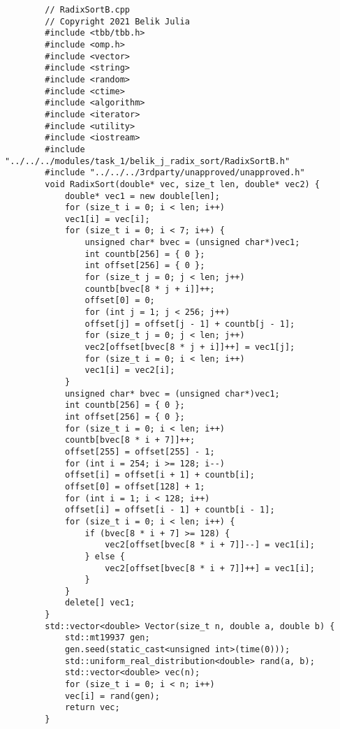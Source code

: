 \documentclass{report}
\begin{document}
	\begin{lstlisting}
		// RadixSortB.cpp
		// Copyright 2021 Belik Julia
		#include <tbb/tbb.h>
		#include <omp.h>
		#include <vector>
		#include <string>
		#include <random>
		#include <ctime>
		#include <algorithm>
		#include <iterator>
		#include <utility>
		#include <iostream>
		#include "../../../modules/task_1/belik_j_radix_sort/RadixSortB.h"
		#include "../../../3rdparty/unapproved/unapproved.h"
		void RadixSort(double* vec, size_t len, double* vec2) {
			double* vec1 = new double[len];
			for (size_t i = 0; i < len; i++)
			vec1[i] = vec[i];
			for (size_t i = 0; i < 7; i++) {
				unsigned char* bvec = (unsigned char*)vec1;
				int countb[256] = { 0 };
				int offset[256] = { 0 };
				for (size_t j = 0; j < len; j++)
				countb[bvec[8 * j + i]]++;
				offset[0] = 0;
				for (int j = 1; j < 256; j++)
				offset[j] = offset[j - 1] + countb[j - 1];
				for (size_t j = 0; j < len; j++)
				vec2[offset[bvec[8 * j + i]]++] = vec1[j];
				for (size_t i = 0; i < len; i++)
				vec1[i] = vec2[i];
			}
			unsigned char* bvec = (unsigned char*)vec1;
			int countb[256] = { 0 };
			int offset[256] = { 0 };
			for (size_t i = 0; i < len; i++)
			countb[bvec[8 * i + 7]]++;
			offset[255] = offset[255] - 1;
			for (int i = 254; i >= 128; i--)
			offset[i] = offset[i + 1] + countb[i];
			offset[0] = offset[128] + 1;
			for (int i = 1; i < 128; i++)
			offset[i] = offset[i - 1] + countb[i - 1];
			for (size_t i = 0; i < len; i++) {
				if (bvec[8 * i + 7] >= 128) {
					vec2[offset[bvec[8 * i + 7]]--] = vec1[i];
				} else {
					vec2[offset[bvec[8 * i + 7]]++] = vec1[i];
				}
			}
			delete[] vec1;
		}
		std::vector<double> Vector(size_t n, double a, double b) {
			std::mt19937 gen;
			gen.seed(static_cast<unsigned int>(time(0)));
			std::uniform_real_distribution<double> rand(a, b);
			std::vector<double> vec(n);
			for (size_t i = 0; i < n; i++)
			vec[i] = rand(gen);
			return vec;
		}
	

\end{lstlisting}
\end{document}
